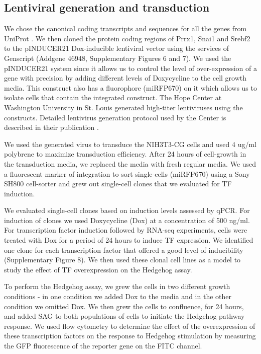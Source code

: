 \subsection{Lentiviral generation and transduction}
We chose the canonical coding transcripts and sequences for all the genes from UniProt \cite{noauthor_2021-be}. We then cloned the protein coding regions of Prrx1, Snai1 and Srebf2 to the pINDUCER21 Dox-inducible lentiviral vector \cite{Meerbrey2011-ew} using the services of Genscript (Addgene 46948, Supplementary Figures 6 and 7). We used the pINDUCER21 system since it allows us to control the level of over-expression of a gene with precision by adding different levels of Doxycycline to the cell growth media. This construct also has a fluorophore (miRFP670) on it which allows us to isolate cells that contain the integrated construct. The Hope Center at Washington University in St. Louis generated high-titer lentiviruses using the constructs. Detailed lentivirus generation protocol used by the Center is described in their publication \cite{Li2012-if}.

We used the generated virus to transduce the NIH3T3-CG cells and used 4 ug/ml polybrene to maximize transduction efficiency. After 24 hours of cell-growth in the transduction media, we replaced the media with fresh regular media. We used a fluorescent marker of integration to sort single-cells (miRFP670) using a Sony SH800 cell-sorter and grew out single-cell clones that we evaluated for TF induction. 

We evaluated single-cell clones based on induction levels assessed by qPCR. For induction of clones we used Doxycycline (Dox) at a concentration of 500 ng/ml. For transcription factor induction followed by RNA-seq experiments, cells were treated with Dox for a period of 24 hours to induce TF expression. We identified one clone for each transcription factor that offered a good level of inducibility (Supplementary Figure 8). We then used these clonal cell lines as a model to study the effect of TF overexpression on the Hedgehog assay. 

To perform the Hedgehog assay, we grew the cells in two different growth conditions - in one condition we added Dox to the media and in the other condition we omitted Dox. We then grew the cells to confluence, for 24 hours, and added SAG to both populations of cells to initiate the Hedgehog pathway response. We used flow cytometry to determine the effect of the overexpression of these transcription factors on the response to Hedgehog stimulation by measuring the GFP fluorescence of the reporter gene on the FITC channel. 


